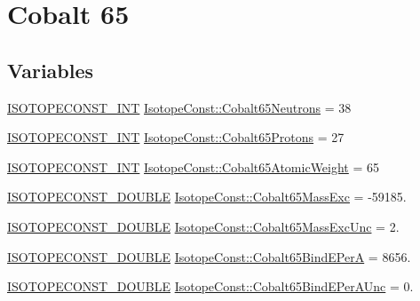 \hypertarget{group___isotope_const-_cobalt-_co65}{}\section{Cobalt 65}
\label{group___isotope_const-_cobalt-_co65}
\subsection*{Variables}
\begin{DoxyCompactItemize}
\item 
\mbox{\hyperlink{group___isotope_const-_macros_ga5f18360b3e99483a35c32d789e62621c}{I\+S\+O\+T\+O\+P\+E\+C\+O\+N\+S\+T\+\_\+\+I\+NT}} \mbox{\hyperlink{group___isotope_const-_cobalt-_co65_ga79986e88e42aac57d4e1fdc7363644ce}{Isotope\+Const\+::\+Cobalt65\+Neutrons}} = 38
\item 
\mbox{\hyperlink{group___isotope_const-_macros_ga5f18360b3e99483a35c32d789e62621c}{I\+S\+O\+T\+O\+P\+E\+C\+O\+N\+S\+T\+\_\+\+I\+NT}} \mbox{\hyperlink{group___isotope_const-_cobalt-_co65_ga592de4d270d775fcca581a610cf30ff4}{Isotope\+Const\+::\+Cobalt65\+Protons}} = 27
\item 
\mbox{\hyperlink{group___isotope_const-_macros_ga5f18360b3e99483a35c32d789e62621c}{I\+S\+O\+T\+O\+P\+E\+C\+O\+N\+S\+T\+\_\+\+I\+NT}} \mbox{\hyperlink{group___isotope_const-_cobalt-_co65_gadb091b31d26ff73b1e4c1a6f5d030d29}{Isotope\+Const\+::\+Cobalt65\+Atomic\+Weight}} = 65
\item 
\mbox{\hyperlink{group___isotope_const-_macros_ga8f45a7272ce02c0b4c65c44636ed719a}{I\+S\+O\+T\+O\+P\+E\+C\+O\+N\+S\+T\+\_\+\+D\+O\+U\+B\+LE}} \mbox{\hyperlink{group___isotope_const-_cobalt-_co65_gaaf073388917deea50a329f6486728585}{Isotope\+Const\+::\+Cobalt65\+Mass\+Exc}} = -\/59185.
\item 
\mbox{\hyperlink{group___isotope_const-_macros_ga8f45a7272ce02c0b4c65c44636ed719a}{I\+S\+O\+T\+O\+P\+E\+C\+O\+N\+S\+T\+\_\+\+D\+O\+U\+B\+LE}} \mbox{\hyperlink{group___isotope_const-_cobalt-_co65_gae893542c2068b82aae3b23652ff2ba4a}{Isotope\+Const\+::\+Cobalt65\+Mass\+Exc\+Unc}} = 2.
\item 
\mbox{\hyperlink{group___isotope_const-_macros_ga8f45a7272ce02c0b4c65c44636ed719a}{I\+S\+O\+T\+O\+P\+E\+C\+O\+N\+S\+T\+\_\+\+D\+O\+U\+B\+LE}} \mbox{\hyperlink{group___isotope_const-_cobalt-_co65_ga16347c37de7701f1aad9dfd3f95b858e}{Isotope\+Const\+::\+Cobalt65\+Bind\+E\+PerA}} = 8656.
\item 
\mbox{\hyperlink{group___isotope_const-_macros_ga8f45a7272ce02c0b4c65c44636ed719a}{I\+S\+O\+T\+O\+P\+E\+C\+O\+N\+S\+T\+\_\+\+D\+O\+U\+B\+LE}} \mbox{\hyperlink{group___isotope_const-_cobalt-_co65_ga3001460cc83284d80f84b438b0aeabdd}{Isotope\+Const\+::\+Cobalt65\+Bind\+E\+Per\+A\+Unc}} = 0.

\end{DoxyCompactItemize}
